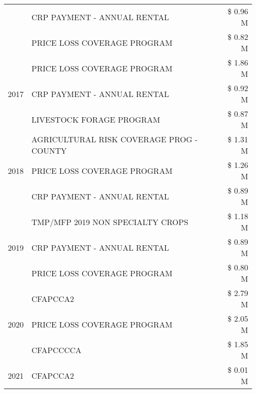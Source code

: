 \begin{tabular}{llr}
 & CRP PAYMENT - ANNUAL RENTAL & \$ 0.96 M \\
 & PRICE LOSS COVERAGE PROGRAM & \$ 0.82 M \\
\cline{1-3}
\multirow[t]{3}{*}{2017} & PRICE LOSS COVERAGE PROGRAM & \$ 1.86 M \\
 & CRP PAYMENT - ANNUAL RENTAL & \$ 0.92 M \\
 & LIVESTOCK FORAGE PROGRAM & \$ 0.87 M \\
\cline{1-3}
\multirow[t]{3}{*}{2018} & AGRICULTURAL RISK COVERAGE PROG - COUNTY & \$ 1.31 M \\
 & PRICE LOSS COVERAGE PROGRAM & \$ 1.26 M \\
 & CRP PAYMENT - ANNUAL RENTAL & \$ 0.89 M \\
\cline{1-3}
\multirow[t]{3}{*}{2019} & TMP/MFP 2019 NON SPECIALTY CROPS & \$ 1.18 M \\
 & CRP PAYMENT - ANNUAL RENTAL & \$ 0.89 M \\
 & PRICE LOSS COVERAGE PROGRAM & \$ 0.80 M \\
\cline{1-3}
\multirow[t]{3}{*}{2020} & CFAPCCA2 & \$ 2.79 M \\
 & PRICE LOSS COVERAGE PROGRAM & \$ 2.05 M \\
 & CFAPCCCCA & \$ 1.85 M \\
\cline{1-3}
2021 & CFAPCCA2 & \$ 0.01 M \\
\cline{1-3}
\bottomrule
\end{tabular}
